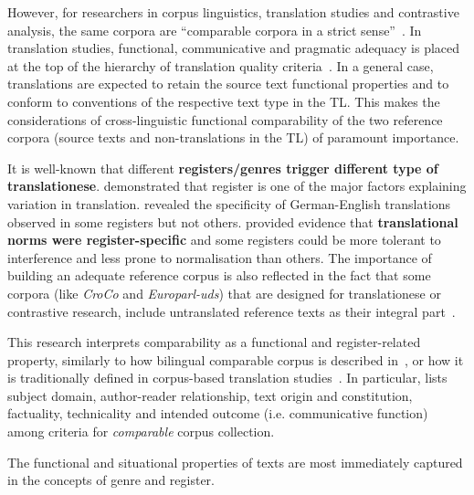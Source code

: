 However, for researchers in corpus linguistics, translation studies and contrastive analysis, the same corpora are ``comparable corpora in a strict sense''~\cite[p.19]{McEnery2007}. 
In translation studies, functional, communicative and pragmatic adequacy is placed at the top of the hierarchy of translation quality criteria~\cite{Nord2006}. In a general case, translations are expected to retain the source text functional properties and to conform to conventions of the respective text type in the TL. This makes the considerations of cross-linguistic functional comparability of the two reference corpora (source texts and non-translations in the TL) of paramount importance. 

It is well-known that different \textbf{registers/genres trigger different type of translationese}. \citet{Lapshinova2017} demonstrated that register is one of the major factors explaining variation in translation. \citet{Neumann2013} revealed the specificity of German-English translations observed in some registers but not others. \citet{Delaere2015} provided evidence that \textbf{translational norms were register-specific} and some registers could be more tolerant to interference and less prone to normalisation than others.
The importance of building an adequate reference corpus is also reflected in the fact that some corpora (like \textit{CroCo} and \textit{Europarl-uds}) that are designed for translationese or contrastive research, include untranslated reference texts as their integral part~\cite[see][respectively]{HansenSchirra2012,Karakanta2018}.

This research interprets comparability as a functional and register-related property, similarly to how bilingual comparable corpus is described in~\citet{Kutuzov2016}, or how it is traditionally defined in corpus-based translation studies~\cite{Zanettin1998}. In particular, \citet{Zanettin1998} lists subject domain, author-reader relationship, text origin and constitution, factuality, technicality and intended outcome (i.e. communicative function) among criteria for \textit{comparable} corpus collection. 

The functional and situational properties of texts are most immediately captured in the concepts of genre and register. 

